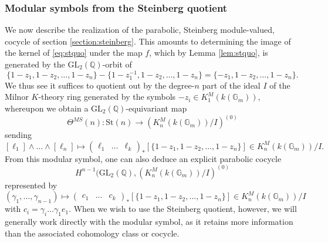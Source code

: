 \documentclass[10pt]{amsart}
\theoremstyle{definition}
\newcommand{\St}{\mathrm{St}}
\numberwithin{equation}{section}
\begin{document}
    \subsubsection{Modular symbols from the Steinberg quotient} \label{section:steinmod}

    We now describe the realization of the parabolic, Steinberg module-valued, cocycle of section \ref{section:steinberg}. This amounts to determining the image of the kernel of \eqref{eq:stquo} under the map $f$, which by Lemma \ref{lem:stquo}, is generated by the $\mathrm{GL}_2(\mathbb{Q})$-orbit of 
    \[
    \{1-z_1,1-z_2,\ldots, 1-z_n\} - \{1-z_1^{-1},1-z_2,\ldots, 1-z_n\} = \{-z_1,1-z_2,\ldots, 1-z_n\}.
    \]
    We thus see it suffices to quotient out by the degree-$n$ part of the ideal $I$ of the Milnor $K$-theory ring generated by the symbols $-z_i\in K_1^M(k(\mathbb{G}_m))$, whereupon we obtain a $\mathrm{GL}_2(\mathbb{Q})$-equivariant map
    \[
    \Theta^{MS}(n):\St(n) \to (K_n^M(k(\mathbb{G}_m))/I)^{(0)}
    \]
    sending
    \[
    [\ell_1]\wedge \ldots \wedge [\ell_n]\mapsto \begin{pmatrix}\ell_1&\ldots & \ell_k\end{pmatrix}_* [\{1-z_1,1-z_2,\ldots, 1-z_n\}] \in  K_n^M(k(\mathbb{G}_m))/I.
    \]
    From this modular symbol, one can also deduce an explicit parabolic cocycle 
    \[H^{n-1}(\mathrm{GL}_2(\mathbb{Q}), (K_n^M(k(\mathbb{G}_m))/I)^{(0)}\] 
    represented by
    \[
    (\gamma_1,\ldots, \gamma_{n-1}) \mapsto \begin{pmatrix}c_1&\ldots & c_k\end{pmatrix}_* [\{1-z_1,1-z_2,\ldots, 1-z_n\}] \in  K_n^M(k(\mathbb{G}_m))/I
    \]
    with $c_i=\gamma_i\ldots \gamma_1 e_1$. When we wish to use the Steinberg quotient, however, we will generally work directly with the modular symbol, as it retains more information than the associated cohomology class or cocycle.
\end{document}
